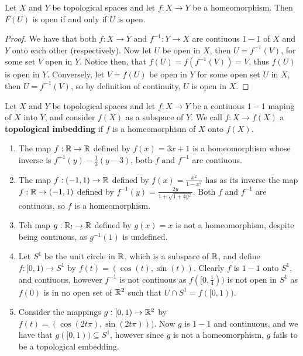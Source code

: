 \begin{lemma}\label{1.7.2} 
    Let $X$ and  $Y$ be topological spaces and let $f:X \rightarrow Y$ be a homeomorphism. Then
    $F(U)$ is open if and only if $U$ is open.
\end{lemma}
\begin{proof}
    We have that both $f:X \rightarrow Y$ and  $f^{-1}:Y \rightarrow X$ are contiuous $1-1$ of $X$
    and  $Y$ onto each other  (respectively). Now let $U$ be open in  $X$, then $U=f^{-1}(V)$, for 
    some set  $V$ open in $Y$. Notice then, that $f(U)=f(f^{-1}(V))=V$, thus $f(U)$ is open in $Y$. 
    Conversely, let $V=f(U)$ be open in $Y$ for some open set  $U$ in  $X$, then  $U=f^{-1}(V)$, so
    by definition of continuity, $U$  is open in $X$.
\end{proof}

\begin{definition}
    Let $X$ and  $Y$ be topological spaces and let  $f:X \rightarrow Y$ be a contiuous  $1-1$ maping
    of  $X$ into  $Y$, and consider  $f(X)$ as a subspace of $Y$. We call  $f:X \rightarrow f(X)$ a
    \textbf{topological imbedding} if $f$ is a homeomorphism of $X$ onto  $f(X)$.
\end{definition}

\begin{example}
    \begin{enumerate}[label=(\arabic*)]
        \item The map $f:\mathbb{R} \rightarrow \mathbb{R}$ defined by  $f(x)=3x+1$ is a homeomorphism whose inverse
            is $f^{-1}(y)-\frac{1}{3}(y-3)$, both $f$ and  $f^{-1}$ are contiuous.

        \item The map $f:(-1,1) \rightarrow \mathbb{R}$ defined by $f(x)=\frac{x^2}{1-x^2}$ has as its
            inverse the map $f:\mathbb{R} \rightarrow (-1,1)$ defined by
            $f^{-1}(y)=\frac{2y}{1+\sqrt{1+4y^2}}$. Both $f$ and  $f^{-1}$ are contiuous, so $f$ is
            a homeomorphism.

        \item Teh map  $g:\mathbb{R}_l \rightarrow \mathbb{R}$ defined by  $g(x)=x$ is not a homeomorphism, despite
            being contiuous, as $g^{-1}(1)$ is undefined.

        \item Let $S^1$ be the unit circle in $\mathbb{R}$, which is a subspace of $\mathbb{R}$, and define
            $f:[0,1) \rightarrow S^1$ by $f(t)=(\cos(t),\sin(t))$. Clearly $f$ is  $1-1$ onto
            $S^1$, and contiuous, however  $f^{-1}$ is not contiuous as $f([0,\frac{1}{4}))$ is not
            open in $S^1$ as  $f(0)$ is in no open set of $\mathbb{R}^2$ such that  $U \cap S^1=f([0,1))$.

        \item Consider the mappings $g:[0,1) \rightarrow \mathbb{R}^2$ by $f(t)=(\cos(2t\pi),\sin(2t\pi)))$.
            Now $g$ is  $1-1$ and continuous, and we have that  $g([0,1)) \subseteq S^1$, however
            since $g$ is not a homeomorphism,  $g$ fails to be a topological embedding.
    \end{enumerate}
\end{example} 
